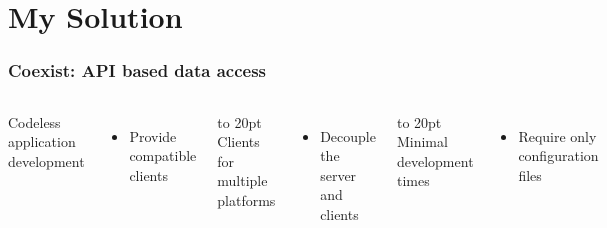 \documentclass[]{beamer}
\newcommand{\pad}{\vbox to 20pt{}}
\begin{document}
\section{My Solution}

\begin{frame}
\frametitle{Coexist: API based data access}


\begin{columns}[c]
\column{2.2in}

Codeless application development
\begin{itemize}
\item Provide compatible clients
\end{itemize}
\pad
Clients for multiple platforms
\begin{itemize}
\item Decouple the server and clients
\end{itemize}

\pad
Minimal development times
\begin{itemize}
\item Require only configuration files
\end{itemize}


\column{2in}
\centering
{}

\end{columns}
\end{frame}






\end{document}
